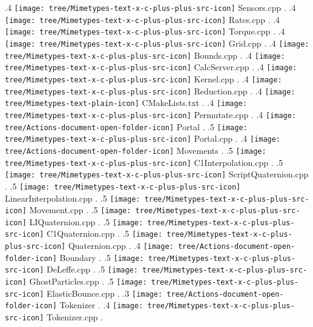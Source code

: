 {.4 { \texttt{[image: tree/Mimetypes-text-x-c-plus-plus-src-icon]} Sensors.cpp }.
.4 { \texttt{[image: tree/Mimetypes-text-x-c-plus-plus-src-icon]} Rates.cpp }.
.4 { \texttt{[image: tree/Mimetypes-text-x-c-plus-plus-src-icon]} Torque.cpp }.
.4 { \texttt{[image: tree/Mimetypes-text-x-c-plus-plus-src-icon]} Grid.cpp }.
.4 { \texttt{[image: tree/Mimetypes-text-x-c-plus-plus-src-icon]} Bounds.cpp }.
.4 { \texttt{[image: tree/Mimetypes-text-x-c-plus-plus-src-icon]} CalcServer.cpp }.
.4 { \texttt{[image: tree/Mimetypes-text-x-c-plus-plus-src-icon]} Kernel.cpp }.
.4 { \texttt{[image: tree/Mimetypes-text-x-c-plus-plus-src-icon]} Reduction.cpp }.
.4 { \texttt{[image: tree/Mimetypes-text-plain-icon]} CMakeLists.txt }.
.4 { \texttt{[image: tree/Mimetypes-text-x-c-plus-plus-src-icon]} Permutate.cpp }.
.4 { \texttt{[image: tree/Actions-document-open-folder-icon]} Portal }.
.5 { \texttt{[image: tree/Mimetypes-text-x-c-plus-plus-src-icon]} Portal.cpp }.
.4 { \texttt{[image: tree/Actions-document-open-folder-icon]} Movements }.
.5 { \texttt{[image: tree/Mimetypes-text-x-c-plus-plus-src-icon]} C1Interpolation.cpp }.
.5 { \texttt{[image: tree/Mimetypes-text-x-c-plus-plus-src-icon]} ScriptQuaternion.cpp }.
.5 { \texttt{[image: tree/Mimetypes-text-x-c-plus-plus-src-icon]} LinearInterpolation.cpp }.
.5 { \texttt{[image: tree/Mimetypes-text-x-c-plus-plus-src-icon]} Movement.cpp }.
.5 { \texttt{[image: tree/Mimetypes-text-x-c-plus-plus-src-icon]} LIQuaternion.cpp }.
.5 { \texttt{[image: tree/Mimetypes-text-x-c-plus-plus-src-icon]} C1Quaternion.cpp }.
.5 { \texttt{[image: tree/Mimetypes-text-x-c-plus-plus-src-icon]} Quaternion.cpp }.
.4 { \texttt{[image: tree/Actions-document-open-folder-icon]} Boundary }.
.5 { \texttt{[image: tree/Mimetypes-text-x-c-plus-plus-src-icon]} DeLeffe.cpp }.
.5 { \texttt{[image: tree/Mimetypes-text-x-c-plus-plus-src-icon]} GhostParticles.cpp }.
.5 { \texttt{[image: tree/Mimetypes-text-x-c-plus-plus-src-icon]} ElasticBounce.cpp }.
.3 { \texttt{[image: tree/Actions-document-open-folder-icon]} Tokenizer }.
.4 { \texttt{[image: tree/Mimetypes-text-x-c-plus-plus-src-icon]} Tokenizer.cpp }.
}
